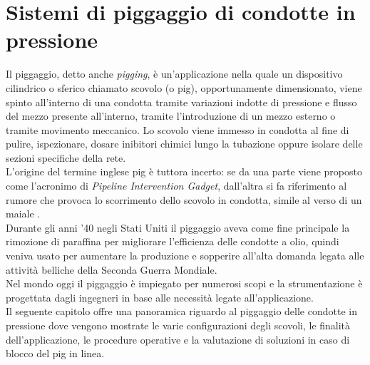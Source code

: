 \clearpage{\pagestyle{empty}\cleardoublepage}

\chapter{Sistemi di piggaggio di condotte in pressione}\thispagestyle{empty} 
Il piggaggio, detto anche \textit{pigging}, è un'applicazione nella quale un dispositivo cilindrico o sferico chiamato scovolo (o pig), opportunamente dimensionato, viene spinto all'interno di una condotta tramite variazioni indotte di pressione e flusso del mezzo presente all'interno, tramite l'introduzione di un mezzo esterno o tramite movimento meccanico. Lo scovolo viene immesso in condotta al fine di pulire, ispezionare, dosare inibitori chimici lungo la tubazione oppure isolare delle sezioni specifiche della rete.\\
L'origine del termine inglese pig è tuttora incerto: se da una parte viene proposto come l'acronimo di \textit{Pipeline Intervention Gadget}, dall'altra si fa riferimento al rumore che provoca lo scorrimento dello scovolo in condotta, simile al verso di un maiale \parencite{varghese2011intelligent}.\\
Durante gli anni '40 negli Stati Uniti il piggaggio aveva come fine principale la rimozione di paraffina per migliorare l'efficienza delle condotte a olio, quindi veniva usato per aumentare la produzione e sopperire all'alta domanda legata alle attività belliche della Seconda Guerra Mondiale.\\
Nel mondo oggi il piggaggio è impiegato per numerosi scopi e la strumentazione  è progettata dagli ingegneri in base alle necessità legate all'applicazione.\\
Il seguente capitolo offre una panoramica riguardo al piggaggio delle condotte in pressione dove vengono mostrate le varie configurazioni degli scovoli, le finalità dell'applicazione, le procedure operative e la valutazione di soluzioni in caso di blocco del pig in linea.

